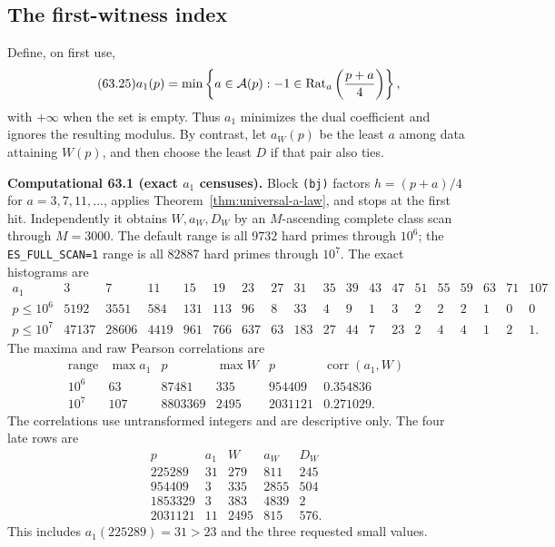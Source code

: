 \documentclass[10pt,reqno]{amsart}
\theoremstyle{definition}
\newcommand{\1}{\mathbf 1}
\begin{document}
\subsection{The first-witness index}
Define, on first use,
\begin{equation}\tag{63.25}
 a_1(p)=\min\left\{a\in\mathcal A(p):
 -1\in\operatorname {Rat}_a\left({p+a\over4}\right)\right\},
\end{equation}
with $+\infty$ when the set is empty.  Thus $a_1$ minimizes the dual
coefficient and ignores the resulting modulus.  By contrast, let $a_W(p)$
be the least $a$ among data attaining $W(p)$, and then choose the least $D$
if that pair also ties.

\medskip\noindent\textbf{Computational 63.1 (exact $a_1$ censuses).}
Block \texttt{(bj)} factors $h=(p+a)/4$ for $a=3,7,11,\ldots$, applies
Theorem~\ref{thm:universal-a-law}, and stops at the first hit.  Independently
it obtains $W,a_W,D_W$ by an $M$-ascending complete class scan through
$M=3000$.  The default range is all $9732$ hard primes through $10^6$; the
\texttt{ES\_FULL\_SCAN=1} range is all $82887$ hard primes through $10^7$.
The exact histograms are
\begingroup\tiny
\setlength{\arraycolsep}{2pt}
\begin{equation}\tag{63.26}
\begin{array}{c|rrrrrrrrrrrrrrrrrr}
a_1&3&7&11&15&19&23&27&31&35&39&43&47&51&55&59&63&71&107\\ \hline
p\leq10^6&5192&3551&584&131&113&96&8&33&4&9&1&3&2&2&2&1&0&0\\
p\leq10^7&47137&28606&4419&961&766&637&63&183&27&44&7&23&2&4&4&1&2&1.
\end{array}
\end{equation}
\endgroup
The maxima and raw Pearson correlations are
\begin{equation}\tag{63.27}
\begin{array}{r|r|r|r|r|r}
\text{range}&\max a_1&p&\max W&p&\operatorname {corr}(a_1,W)\\ \hline
10^6&63&87481&335&954409&0.354836\\
10^7&107&8803369&2495&2031121&0.271029.
\end{array}
\end{equation}
The correlations use untransformed integers and are descriptive only.  The
four late rows are
\begin{equation}\tag{63.28}
\begin{array}{r|r|r|r|r}
p&a_1&W&a_W&D_W\\ \hline
225289&31&279&811&245\\
954409&3&335&2855&504\\
1853329&3&383&4839&2\\
2031121&11&2495&815&576.
\end{array}
\end{equation}
This includes $a_1(225289)=31>23$ and the three requested small values.
\end{document}
